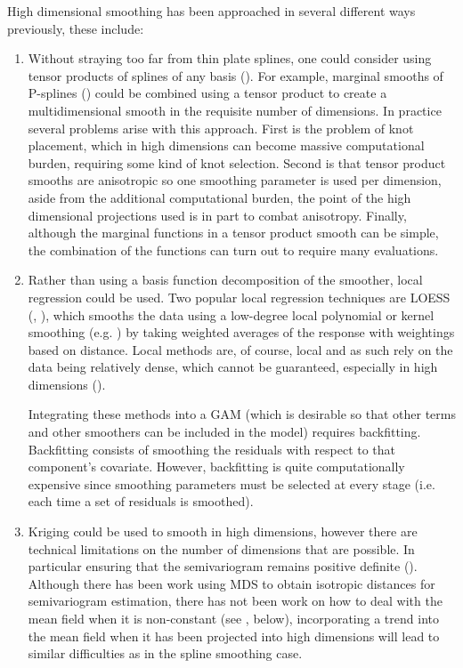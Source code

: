 High dimensional smoothing has been approached in several different ways previously, these include:
\begin{enumerate}
   \item Without straying too far from thin plate splines, one could consider using tensor products of splines of any basis (). For example, marginal smooths of P-splines () could be combined using a tensor product to create a multidimensional smooth in the requisite number of dimensions. In practice several problems arise with this approach. First is the problem of knot placement, which in high dimensions can become massive computational burden, requiring some kind of knot selection. Second is that tensor product smooths are anisotropic so one smoothing parameter is used per dimension, aside from the additional computational burden, the point of the high dimensional projections used is in part to combat anisotropy. Finally, although the marginal functions in a tensor product smooth can be simple, the combination of the functions can turn out to require many evaluations.
   \item Rather than using a basis function decomposition of the smoother, local regression could be used. Two popular local regression techniques are LOESS (\cite{loess1}, \cite{loess2}), which smooths the data using a low-degree local polynomial or kernel smoothing (e.g. \cite[pp. 194-200]{elements}) by taking weighted averages of the response with weightings based on distance. Local methods are, of course, local and as such rely on the data being relatively dense, which cannot be guaranteed, especially in high dimensions (\cite[p. 200]{elements}). 

Integrating these methods into a GAM (which is desirable so that other terms and other smoothers can be included in the model) requires backfitting. Backfitting consists of smoothing the residuals with respect to that component's covariate. However, backfitting is quite computationally expensive since smoothing parameters must be selected at every stage (i.e. each time a set of residuals is smoothed).

   \item Kriging could be used to smooth in high dimensions, however there are technical limitations on the number of dimensions that are possible. In particular ensuring that the semivariogram remains positive definite (\cite{boisvert}). Although there has been work using MDS to obtain isotropic distances for semivariogram estimation, there has not been work on how to deal with the mean field when it is non-constant (see , below), incorporating a trend into the mean field when it has been projected into high dimensions will lead to similar difficulties as in the spline smoothing case.
\end{enumerate}

